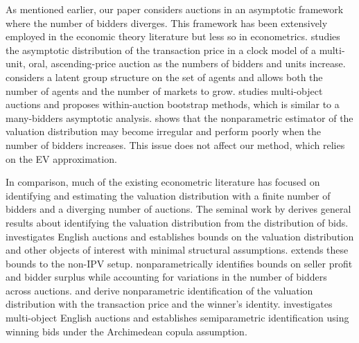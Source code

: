 As mentioned earlier, our paper considers auctions in an asymptotic framework where the number of bidders diverges. This framework has been extensively employed in the economic theory literature \citep[e.g.,][]{hongshum2004,virag2013,ditillio2021} but less so in econometrics. \citet{HongPaarschXu2014} studies the asymptotic distribution of the transaction price in a clock model of a multi-unit, oral, ascending-price auction as the numbers of bidders and units increase. \citet{krasnokutskaya2022estimating} considers a latent group structure on the set of agents and allows both the number of agents and the number of markets to grow. \citet{cassola20132007} studies multi-object auctions and proposes within-auction bootstrap methods, which is similar to a many-bidders asymptotic analysis. \citet{menzel2013} shows that the nonparametric estimator of the valuation distribution may become irregular and perform poorly when the number of bidders increases. This issue does not affect our method, which relies on the EV approximation. %

In comparison, much of the existing econometric literature has focused on identifying and estimating the valuation distribution with a finite number of bidders and a diverging number of auctions. 
The seminal work by \citet{athey2002} derives general results about identifying the valuation distribution from the distribution of bids. \citet{hailetamer2003} investigates English auctions and establishes bounds on the valuation distribution and other objects of interest with minimal structural assumptions. \cite{chesher2017wp} extends these bounds to the non-IPV setup. 
\citet{aradillas2013} nonparametrically identifies bounds on seller profit and bidder surplus while accounting for variations in the number of bidders across auctions. \citet{BrendstrupPaarsch2006} and \citet{Komarova2013} derive nonparametric identification of the valuation distribution with the transaction price and the winner's identity. \citet{BrendstrupPaarsch2007} investigates multi-object English auctions and establishes semiparametric identification using winning bids under the Archimedean copula assumption.

